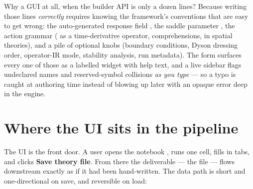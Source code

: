 \begin{note}
Why a GUI at all, when the builder API is only a dozen lines? Because writing
those lines \emph{correctly} requires knowing the framework's conventions that
are easy to get wrong: the auto-generated response field , the
saddle parameter , the action grammar ( as a
time-derivative operator,  comprehensions,  in
spatial theories), and a pile of optional knobs (boundary conditions, Dyson
dressing order, operator-IR mode, stability analysis, run metadata). The form
surfaces every one of those as a labelled widget with help text, and a live
sidebar flags undeclared names and reserved-symbol collisions \emph{as you type}
--- so a typo is caught at authoring time instead of blowing up later with an
opaque  error deep in the engine.
\end{note}

\section{Where the UI sits in the pipeline}

The UI is the front door. A user opens the notebook
, runs one cell, fills in tabs, and clicks
\textbf{Save theory file}. From there the deliverable --- the 
file --- flows downstream exactly as if it had been hand-written. The data path
is short and one-directional on save, and reversible on load:

